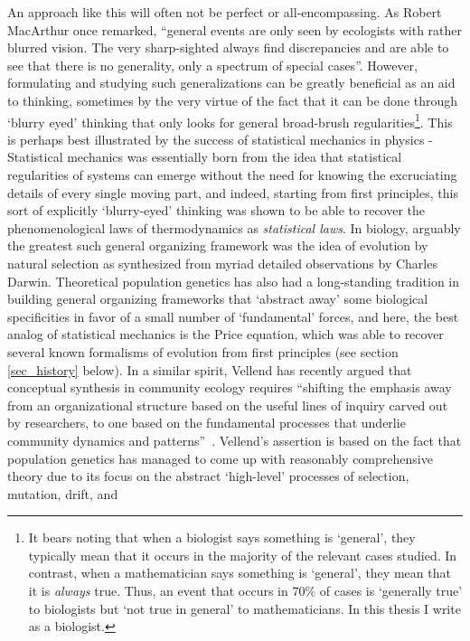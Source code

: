 An approach like this will often not be perfect or all-encompassing. As Robert MacArthur once remarked, ``general events are only seen by ecologists with rather blurred vision. The very sharp-sighted always find discrepancies and are able to see that there is no generality, only a spectrum of special cases”\citep{kingsland_modeling_1985}. However, formulating and studying such generalizations can be greatly beneficial as an aid to thinking, sometimes by the very virtue of the fact that it can be done through `blurry eyed' thinking that only looks for general broad-brush regularities\footnote{It bears noting that when a biologist says something is `general', they typically mean that it occurs in the majority of the relevant cases studied. In contrast, when a mathematician says something is `general', they mean that it is \emph{always} true. Thus, an event that occurs in 70\% of cases is `generally true' to biologists but `not true in general' to mathematicians. In this thesis I write as a biologist.}. This is perhaps best illustrated by the success of statistical mechanics in physics - Statistical mechanics was essentially born from the idea that statistical regularities of systems can emerge without the need for knowing the excruciating details of every single moving part, and indeed, starting from first principles, this sort of explicitly `blurry-eyed' thinking was shown to be able to recover the phenomenological laws of thermodynamics as \emph{statistical laws}. In biology, arguably the greatest such general organizing framework was the idea of evolution by natural selection as synthesized from myriad detailed observations by Charles Darwin. Theoretical population genetics has also had a long-standing tradition in building general organizing frameworks that `abstract away' some biological specificities in favor of a small number of `fundamental' forces, and here, the best analog of statistical mechanics is the Price equation, which was able to recover several known formalisms of evolution from first principles (see section \ref{sec_history} below). In a similar spirit, Vellend has recently argued that conceptual synthesis in community ecology requires
``shifting the emphasis away from an organizational structure based on the useful lines of
inquiry carved out by researchers, to one based on the fundamental processes that underlie community dynamics and patterns''~\citep{vellend_theory_2016}. Vellend's assertion is based on the
fact that population genetics has managed to come up  with reasonably comprehensive theory due to its focus on the abstract `high-level’ processes of selection, mutation, drift, and
